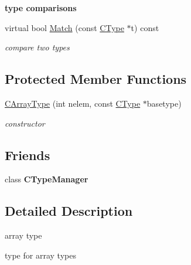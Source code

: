 \begin{Indent}{\bf type comparisons}\par
\begin{DoxyCompactItemize}
\item 
virtual bool \hyperlink{classCArrayType_ac1efc1a71cba37cc52d7117623154c23}{Match} (const \hyperlink{classCType}{C\-Type} $\ast$t) const 
\begin{DoxyCompactList}\small\item\em compare two types \end{DoxyCompactList}\end{DoxyCompactItemize}
\end{Indent}
\subsection*{Protected Member Functions}
\begin{DoxyCompactItemize}
\item 
\hyperlink{classCArrayType_a7048cacbf0f0e40fc8c783627e14e863}{C\-Array\-Type} (int nelem, const \hyperlink{classCType}{C\-Type} $\ast$basetype)
\begin{DoxyCompactList}\small\item\em constructor \end{DoxyCompactList}\end{DoxyCompactItemize}
\subsection*{Friends}
\begin{DoxyCompactItemize}
\item 
\hypertarget{classCArrayType_afbe628f2f200bdbd3835c1097d5d5131}{class {\bfseries C\-Type\-Manager}}\label{classCArrayType_afbe628f2f200bdbd3835c1097d5d5131}

\end{DoxyCompactItemize}


\subsection{Detailed Description}
array type 

type for array types 

